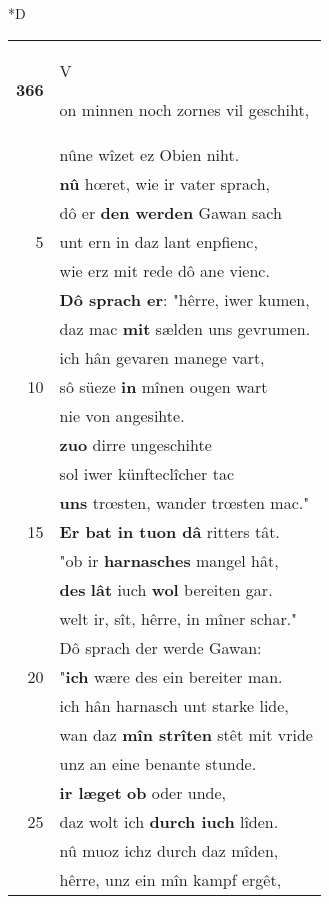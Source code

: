 \documentclass[8pt,a4paper,notitlepage]{article}
\begin{document}
\begin{table}[ht]
\begin{minipage}[t]{0.5\linewidth}
\small
\begin{center}*D
\end{center}
\begin{tabular}{rl}
\textbf{366} & \begin{large}V\end{large}on minnen noch zornes vil geschiht,\\ 
 & nûne wîzet ez Obien niht.\\ 
 & \textbf{nû} hœret, wie ir vater sprach,\\ 
 & dô er \textbf{den werden} Gawan sach\\ 
5 & unt ern in daz lant enpfienc,\\ 
 & wie erz mit rede dô ane vienc.\\ 
 & \textbf{Dô sprach er}: "hêrre, iwer kumen,\\ 
 & daz mac \textbf{mit} sælden uns gevrumen.\\ 
 & ich hân gevaren manege vart,\\ 
10 & sô süeze \textbf{in} mînen ougen wart\\ 
 & nie von angesihte.\\ 
 & \textbf{zuo} dirre ungeschihte\\ 
 & sol iwer künfteclîcher tac\\ 
 & \textbf{uns} trœsten, wander trœsten mac."\\ 
15 & \textbf{Er bat in tuon dâ} ritters tât.\\ 
 & "ob ir \textbf{harnasches} mangel hât,\\ 
 & \textbf{des} \textbf{lât} iuch \textbf{wol} bereiten gar.\\ 
 & welt ir, sît, hêrre, in mîner schar."\\ 
 & Dô sprach der werde Gawan:\\ 
20 & "\textbf{ich} wære des ein bereiter man.\\ 
 & ich hân harnasch unt starke lide,\\ 
 & wan daz \textbf{mîn strîten} stêt mit vride\\ 
 & unz an eine benante stunde.\\ 
 & \textbf{ir læget} \textbf{ob} oder unde,\\ 
25 & daz wolt ich \textbf{durch iuch} lîden.\\ 
 & nû muoz ichz durch daz mîden,\\ 
 & hêrre, unz ein mîn kampf ergêt,\\ 

\end{tabular}
\end{minipage}
\end{table}
\end{document}
